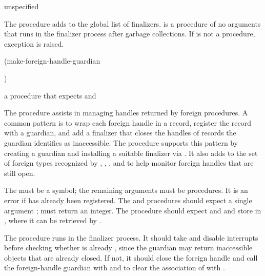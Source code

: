 \begin{procedure}
\end{procedure}
\returns{} unspecified

The  procedure adds
 to the global list of finalizers.  is a
procedure of no arguments that runs in the finalizer process after
garbage collections. If  is not a procedure, exception
 is raised.

\begin{procedure}
\codebegin
(make-foreign-handle-guardian   \strut
                                )\strut
\codeend
\end{procedure}
\returns{} a procedure that expects  and 

The  procedure assists in managing handles
returned by foreign procedures.
A common pattern is to wrap each foreign handle in a record, register the
record with a guardian, and add a finalizer that closes the handles of records
the guardian identifies as inaccessible.
The  procedure supports this pattern
by creating a guardian and installing a suitable finalizer via .
It also adds  to the set of foreign types recognized by
,
,
, and
to help monitor foreign handles that are still open.

The  must be a symbol; the remaining arguments must be
procedures.  It is an error if  has already been registered.
The  and  procedures should expect a
single argument ;  must return an integer.
The  procedure should expect  and  and
store  in , where it can be retrieved by .

The  procedure runs in the finalizer process.
It should take  and disable interrupts before checking whether
 is already ,
since the guardian may return inaccessible objects that are already closed.
If not, it should close the foreign handle and call the foreign-handle guardian
with  and  to clear the association of  with .

